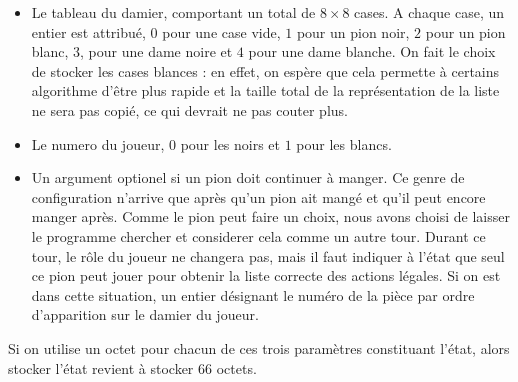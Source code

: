 \documentclass[a4paper,11pt]{article}
\begin{document}
\begin{multicols}{2}[]
    \begin{itemize} 
      \item Le tableau du damier, comportant un total de \begin{math} 8 \times 8
        \end{math} cases. A chaque case, un entier est attribué, \begin{math} 0
        \end{math} pour une case vide, \begin{math} 1 \end{math} pour un pion
        noir, \begin{math} 2 \end{math} pour un pion blanc, \begin{math} 3
        \end{math}, pour une dame noire et \begin{math} 4 \end{math} pour une
        dame blanche. On fait le choix de stocker les cases blances : en effet,
        on espère que cela permette à certains algorithme d'être plus rapide et
        la taille total de la représentation de la liste ne sera pas copié, ce
        qui devrait ne pas couter plus.  
      \item Le numero du joueur, \begin{math} 0 \end{math} pour les noirs et
        \begin{math} 1 \end{math} pour les blancs.
      \item Un argument optionel si un pion doit continuer à manger. Ce genre de
        configuration n'arrive que après qu'un pion ait mangé et qu'il peut
        encore manger après. Comme le pion peut faire un choix, nous avons
        choisi de laisser le programme chercher et considerer cela comme un
        autre tour.  Durant ce tour, le rôle du joueur ne changera pas, mais il
        faut indiquer à l'état que seul ce pion peut jouer pour obtenir la
        liste correcte des actions légales. Si on est dans cette situation, un
        entier désignant le numéro de la pièce par ordre d'apparition sur le
        damier du joueur.
    \end{itemize}

    Si on utilise un octet pour chacun de ces trois paramètres constituant
    l'état, alors stocker l'état revient à stocker 66 octets.



\end{multicols}
\end{document}
